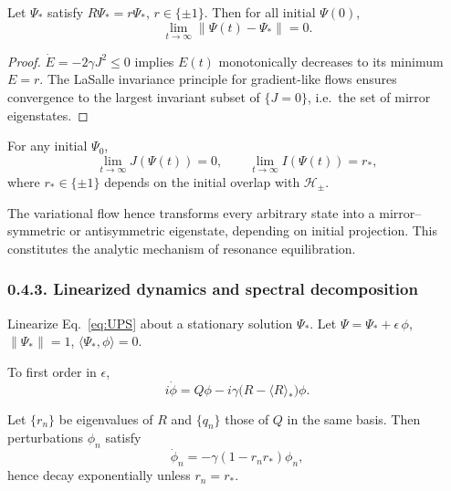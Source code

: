 \begin{theorem}
Let $\Psi_*$ satisfy $R\Psi_*=r\Psi_*$, $r\in\{\pm1\}$.
Then for all initial $\Psi(0)$,
\[
\lim_{t\to\infty}\|\Psi(t)-\Psi_*\|=0.
\]
\end{theorem}

\begin{proof}
$\dot E=-2\gamma J^2\le0$ implies $E(t)$ monotonically decreases to its minimum $E=r$.
The LaSalle invariance principle for gradient-like flows ensures convergence to the largest invariant subset of $\{J=0\}$, i.e.\ the set of mirror eigenstates.
\end{proof}

\begin{corollary}
For any initial $\Psi_0$,
\[
\lim_{t\to\infty}J(\Psi(t))=0, \qquad
\lim_{t\to\infty}I(\Psi(t))=r_*,
\]
where $r_*\in\{\pm1\}$ depends on the initial overlap with $\mathcal{H}_\pm$.
\end{corollary}

\begin{remark}
The variational flow hence transforms every arbitrary state into a mirror–symmetric or antisymmetric eigenstate, 
depending on initial projection. 
This constitutes the analytic mechanism of resonance equilibration.
\end{remark}

\subsubsection*{0.4.3. Linearized dynamics and spectral decomposition}

Linearize Eq.~\eqref{eq:UPS} about a stationary solution $\Psi_*$. 
Let $\Psi=\Psi_*+\epsilon\,\phi$, $\|\Psi_*\|=1$, $\langle\Psi_*,\phi\rangle=0$.

\begin{proposition}
To first order in $\epsilon$,
\[
i\dot\phi
=
Q\phi
 - i\gamma\big(R-\langle R\rangle_*\big)\phi.
\]
\end{proposition}

\begin{theorem}
Let $\{r_n\}$ be eigenvalues of $R$ and $\{q_n\}$ those of $Q$ in the same basis.
Then perturbations $\phi_n$ satisfy
\[
\dot\phi_n = -\gamma(1-r_nr_*)\phi_n,
\]
hence decay exponentially unless $r_n=r_*$.
\end{theorem}

